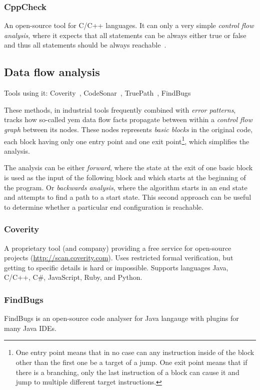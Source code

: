 \subsubsection{CppCheck}
An open-source tool for C/C++ languages. It can only a very simple {\em control flow analysis}, where it expects that all statements can be always either true or false and thus all statements should be always reachable~\cite{cppcheckDesign}.

\subsection{Data flow analysis}
Tools using it: Coverity~\cite{KrenaVojnarOverview}, CodeSonar~\cite{KrenaVojnarOverview}, TruePath~\cite{KrenaVojnarOverview}, FindBugs~\cite{KrenaVojnarOverview}

These methods, in industrial tools frequently combined with {\em error patterns}, tracks how so-called {yem data flow facts} propagate between within a {\em control flow graph} between its nodes. These nodes represents {\em basic blocks} in the original code, each block having only one entry point and one exit point\footnote{One entry point means that in no case can any instruction inside of the block other than the first one be a target of a jump. One exit point means that if there is a branching, only the last instruction of a block can cause it and jump to multiple different target instructions.}, which simplifies the analysis.

The analysis can be either {\em forward}, where the state at the exit of one basic block is used as the input of the following block and which starts at the beginning of the program. Or {\em backwards analysis}, where the algorithm starts in an end state and attempts to find a path to a start state. This second approach can be useful to determine whether a particular end configuration is reachable.

\subsubsection{Coverity}
A proprietary tool (and company) providing a free service for open-source projects (\url{http://scan.coverity.com}). Uses restricted formal verification, but getting to specific details is hard or impossible. Supports languages Java, C/C++, C\#, JavaScript, Ruby, and Python.

\subsubsection{FindBugs}
FindBugs is an open-source code analyser for Java langauge with plugins for many Java IDEs.

